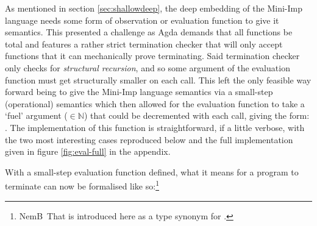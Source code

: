 \documentclass[oneside,12pt]{article}
\newcommand\NB[1][0.1]{N\kern-#1emB \,} %
\begin{document}
As mentioned in section \ref{sec:shallowdeep}, the deep embedding of the Mini-Imp language needs some form of observation or evaluation function to give it semantics. This presented a challenge as Agda demands that all functions be total and features a rather strict termination checker that will only accept functions that it can mechanically prove terminating. Said termination checker only checks for \emph{structural recursion}, and so some argument of the evaluation function must get structurally smaller on each call. This left the only feasible way forward being to give the Mini-Imp language semantics via a \mbox{small-step} \mbox{(operational)} semantics which then allowed for the evaluation function to take a `fuel' argument ($\in \mathbb{N}$) that could be decremented with each call, \mbox{giving} the form: \AgdaSpace{}\AgdaSymbol{:}\AgdaSpace{}\AgdaSpace{}\AgdaSpace{}\AgdaSpace{}\AgdaSpace{}\AgdaSpace{}\AgdaSpace{}\AgdaSpace{}. The implementation of this function is straightforward, if a little verbose, with the two most interesting cases reproduced below and the full implementation given in figure \ref{fig:eval-full} in the appendix.

\vspace{-1em}

{\centering


\vspace{-3.2em}


}


With a small-step evaluation function defined, what it means for a program to terminate can now be formalised like so:\footnote{\NB That  is introduced here as a type synonym for .}


{\advance{}\mathindent



\vspace{-0.8cm}



\vspace{-0.8cm}



\vspace{-0.8cm}



}
\end{document}
